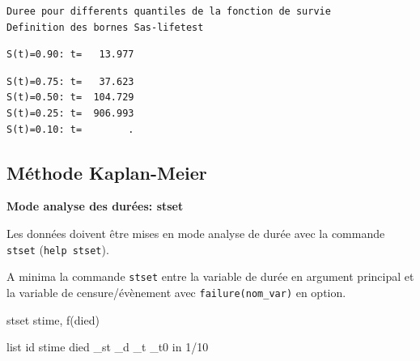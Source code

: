 \documentclass[
  12pt,
  letterpaper,
  DIV=11,
  numbers=noendperiod,
  onepage,
  openany]{scrreprt}
\newenvironment{Shaded}{\begin{snugshade}}{\end{snugshade}}
\newcommand{\KeywordTok}[1]{\textcolor[rgb]{0.94,0.87,0.69}{#1}}
\newcommand{\NormalTok}[1]{\textcolor[rgb]{0.80,0.80,0.80}{#1}}
\newcommand{\OtherTok}[1]{\textcolor[rgb]{0.94,0.94,0.56}{#1}}
\begin{document}
\begin{verbatim}
Duree pour differents quantiles de la fonction de survie
Definition des bornes Sas-lifetest
\end{verbatim}

\begin{verbatim}
S(t)=0.90: t=   13.977
\end{verbatim}

\begin{verbatim}
S(t)=0.75: t=   37.623
S(t)=0.50: t=  104.729
S(t)=0.25: t=  906.993
S(t)=0.10: t=        .
\end{verbatim}

\hypertarget{muxe9thode-kaplan-meier-1}{%
\subsection{Méthode Kaplan-Meier}\label{muxe9thode-kaplan-meier-1}}

\textbf{Mode analyse des durées: stset}

Les données doivent être mises en mode analyse de durée avec la commande
\texttt{stset} (\texttt{help\ stset}).

A minima la commande \texttt{stset} entre la variable de durée en
argument principal et la variable de censure/évènement avec
\texttt{failure(nom\_var)} en option.

\begin{Shaded}
\begin{Highlighting}[]
\KeywordTok{stset}\NormalTok{ stime, f(died)}

\OtherTok{list}\NormalTok{ id stime died \_st \_d \_t \_t0 }\KeywordTok{in}\NormalTok{ 1/10}
\end{Highlighting}
\end{Shaded}
\end{document}
